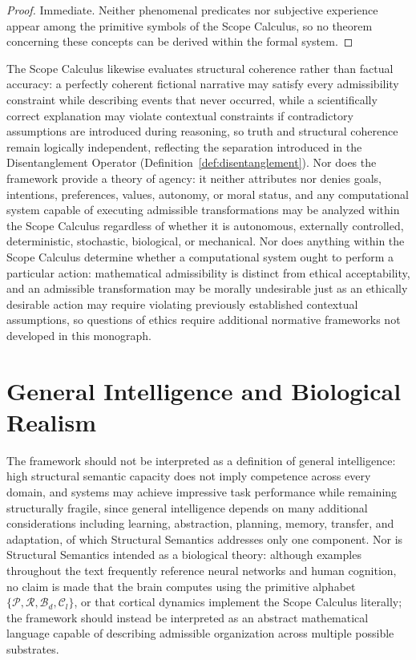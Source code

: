 \documentclass[11pt,twoside,openright]{book}
\numberwithin{equation}{chapter}
\theoremstyle{definition}
\theoremstyle{plain}
\theoremstyle{remark}
\theoremstyle{definition}
\newcommand{\Pop}{\mathcal{P}}
\newcommand{\Refuse}{\mathcal{R}}
\newcommand{\Bind}{\mathcal{B}_d}
\newcommand{\Collapse}{\mathcal{C}_l}
\begin{document}
\begin{proof}
Immediate. Neither phenomenal predicates nor subjective experience appear
among the primitive symbols of the Scope Calculus, so no theorem
concerning these concepts can be derived within the formal system.
\end{proof}

The Scope Calculus likewise evaluates structural coherence rather than
factual accuracy: a perfectly coherent fictional narrative may satisfy
every admissibility constraint while describing events that never
occurred, while a scientifically correct explanation may violate
contextual constraints if contradictory assumptions are introduced during
reasoning, so truth and structural coherence remain logically
independent, reflecting the separation introduced in the Disentanglement
Operator (Definition~\ref{def:disentanglement}). Nor does the framework
provide a theory of agency: it neither attributes nor denies goals,
intentions, preferences, values, autonomy, or moral status, and any
computational system capable of executing admissible transformations may
be analyzed within the Scope Calculus regardless of whether it is
autonomous, externally controlled, deterministic, stochastic, biological,
or mechanical. Nor does anything within the Scope Calculus determine
whether a computational system ought to perform a particular action:
mathematical admissibility is distinct from ethical acceptability, and an
admissible transformation may be morally undesirable just as an ethically
desirable action may require violating previously established contextual
assumptions, so questions of ethics require additional normative
frameworks not developed in this monograph.

\section{General Intelligence and Biological Realism}

The framework should not be interpreted as a definition of general
intelligence: high structural semantic capacity does not imply competence
across every domain, and systems may achieve impressive task performance
while remaining structurally fragile, since general intelligence depends
on many additional considerations including learning, abstraction,
planning, memory, transfer, and adaptation, of which Structural Semantics
addresses only one component. Nor is Structural Semantics intended as a
biological theory: although examples throughout the text frequently
reference neural networks and human cognition, no claim is made that the
brain computes using the primitive alphabet $\{\Pop,\Refuse,\Bind,\Collapse\}$,
or that cortical dynamics implement the Scope Calculus literally; the
framework should instead be interpreted as an abstract mathematical
language capable of describing admissible organization across multiple
possible substrates.
\end{document}
